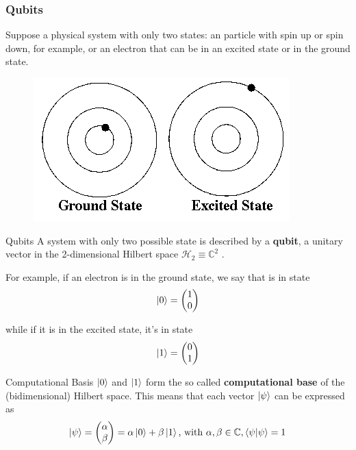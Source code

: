 \documentclass{beamer}
\newcommand{\calH}{\mathcal{H}}
\newcommand{\kp}{\ket{\psi}}
\newcommand{\kz}{\ket{0}}
\newcommand{\ko}{\ket{1}}
\begin{document}
\begin{frame}%
	\frametitle{Qubits}
	Suppose a physical system with only two states: an particle with spin up or spin down, for example, or an electron that can be in an excited state or in the ground state.
\begin{figure}
\includegraphics[scale=0.7]{states}	
\end{figure}	
	\begin{block}{Qubits}
	A system with only two possible state is described by a \textbf{qubit}, a unitary vector in the 2-dimensional Hilbert space 
	$\calH_2 \equiv \mathbb{C}^2$	.
	\end{block}
\end{frame}

\begin{frame}%
For example, if an electron is in the ground state, we say that is in state 
$$\ket{0} = \begin{pmatrix}
1 \\
0
\end{pmatrix}	$$

while if it is in the excited state, it's in state 
$$\ket{1} = \begin{pmatrix}
0\\
1
\end{pmatrix}$$


\begin{block}{Computational Basis}
$\ket{0}$ and $\ket{1}$ form the so called \textbf{computational base} of the (bidimensional) Hilbert space. This means that each vector $\kp$ can be expressed as
\[
	\kp = \begin{pmatrix}
	\alpha \\
	\beta
	\end{pmatrix} = \alpha\kz + \beta\ko\text{, with }\alpha, \beta \in \mathbb{C}, \braket{\psi | \psi} = 1
\]
\end{block}
\end{frame}
\end{document}
